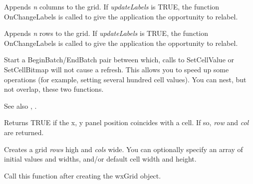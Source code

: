 Appends {\it n} columns to the grid. If {\it updateLabels} is TRUE,
the function OnChangeLabels is called to give the application the opportunity to relabel.

\label{wxgridappendrows}


Appends {\it n} rows to the grid. If {\it updateLabels} is TRUE,
the function OnChangeLabels is called to give the application the opportunity to relabel.

\label{wxgridbeginbatch}


Start a BeginBatch/EndBatch pair between which, calls to SetCellValue or
SetCellBitmap will not cause a refresh. This allows you to speed up some operations
(for example, setting several hundred cell values). You can nest, but not overlap,
these two functions.

See also , .

\label{wxgridcellhittest}


Returns TRUE if the x, y panel position coincides with a cell. If so, {\it row} and {\it col} are
returned.

\label{wxgridcreategrid}


Creates a grid {\it rows} high and {\it cols} wide. You can optionally specify an array of initial values
and widths, and/or default cell width and height.

Call this function after creating the wxGrid object.


